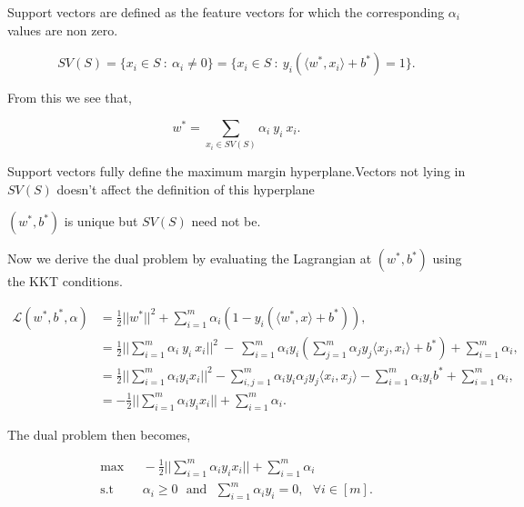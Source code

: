 \documentclass[a4paper,english,12pt]{article}
\begin{document}
\begin{defn}
Support vectors are defined as the feature vectors for which the corresponding $\alpha_i$ values are non zero.

\begin{equation}
SV(S) = \{ x_i \in S ~:~ \alpha_i  \neq 0 \} =  \{ x_i \in S ~:~ y_i(\langle w^*,x_i \rangle + b^* ) =  1\}.
\end{equation} 

\end{defn}

From this we see that,

\begin{equation}
w^* = \sum_{x_i \in SV(S)} \alpha_i~ y_i ~x_i.
\end{equation}




\begin{rem}
Support vectors fully define the maximum margin hyperplane.Vectors not lying in $SV(S)$ doesn't affect the definition of this hyperplane
\end{rem}


\begin{rem}
$(w^*, b^*)$ is unique but $SV(S)$ need not be.
\end{rem}

Now we derive the dual problem by evaluating the Lagrangian at $(w^*, b^*)$ using the KKT conditions.

\begin{align}
\mathcal{L}(w^*,b^*, \alpha) &= \frac{1}{2} || w^*||^2 +  \sum_{i = 1}^m \alpha_i (1 -  y_i ( \langle w^*,x \rangle + b^*)), \\
&= \frac{1}{2} || \sum_{i =1} ^m \alpha_i~ y_i ~x_i||^2  ~- ~ \sum_{i = 1}^{m} \alpha_i y_i ( \sum_{j=1}^m\alpha_j y_j \langle x_j, x_i \rangle + b^*) +  \sum_{i =1}^{m} \alpha_i,\\
&= \frac12 || \sum_{i =1}^m \alpha_i y_i x_i ||^2  -  \sum_{i,j =1}^m \alpha_i y_i \alpha_j y_j  \langle x_i, x_j \rangle - \sum_{i = 1}^m \alpha_i y_i b^*  + \sum_{i =1}^{m} \alpha_i,\\
&=  -\frac12 || \sum_{i =1}^m \alpha_i y_i x_i || + \sum_{i = 1}^{m} \alpha_ i.
\end{align}

The dual problem then becomes,

\begin{align}
\text{max} &~~~-\frac12 || \sum_{i =1}^m \alpha_i y_i x_i || + \sum_{i = 1}^{m} \alpha_ i \\
\text{s.t}& ~~~\alpha_i \geq 0  ~~~ \text{and} ~~~  \sum_{i =1}^m \alpha_i y_i = 0, ~~~ \forall i \in [m].
\end{align}
\end{document}
